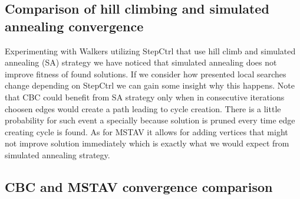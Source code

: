 \subsection{Comparison of hill climbing and simulated annealing convergence}
\FloatBarrier
Experimenting with Walkers utilizing StepCtrl that use hill climb and simulated annealing (SA) strategy we have noticed that simulated annealing does not improve fitness of found solutions.
If we consider how presented local searches change depending on StepCtrl we can gain some insight why this happens.
Note that CBC could benefit from SA strategy only when in consecutive iterations choosen edges would create a path leading to cycle creation. There is a little probability for such event a specially because solution is pruned every time edge creating cycle is found. As for MSTAV it allows for adding vertices that might not improve solution immediately which is exactly what we would expect from simulated annealing strategy.

\begin{figure}[hb]

\end{figure}
\begin{figure}[hb]

\end{figure}
\begin{figure}[hb]

\end{figure}
\begin{figure}[hb]

\end{figure}
\FloatBarrier

\subsection{CBC and MSTAV convergence comparison}
\FloatBarrier

\begin{figure}[hb]

\end{figure}
\begin{figure}[hb]

\end{figure}
\FloatBarrier

